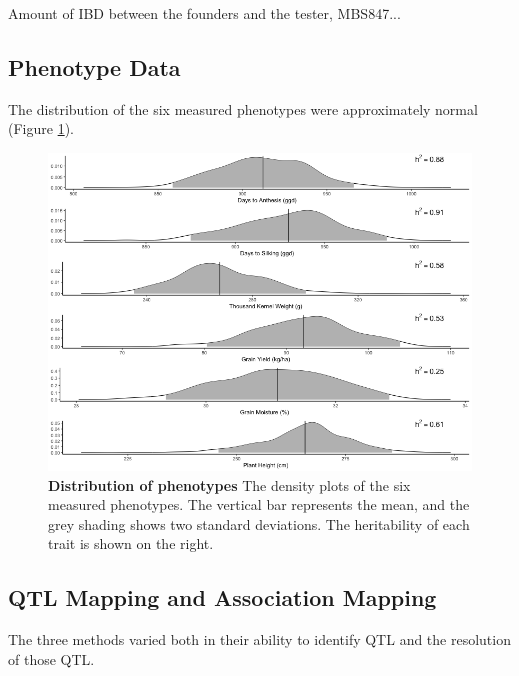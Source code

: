 \documentclass[article,9pt,twocolumn,twoside]{rilabRxiv}
\begin{document}
Amount of IBD between the founders and the tester, MBS847...


\subsection{Phenotype Data}
The distribution of the six measured phenotypes were approximately normal (Figure \ref{fig:figure2}).

\begin{figure}[ht]
\centering
\includegraphics[width=\linewidth]{figures/Methods_Fig2.png}
\caption{\textbf{Distribution of phenotypes} The density plots of the six measured phenotypes. The vertical bar represents the mean, and the grey shading shows two standard deviations. The heritability of each trait is shown on the right.}
\label{fig:figure2}
\end{figure}

\subsection{QTL Mapping and Association Mapping}
The three methods varied both in their ability to identify QTL and the resolution of those QTL.
\end{document}
